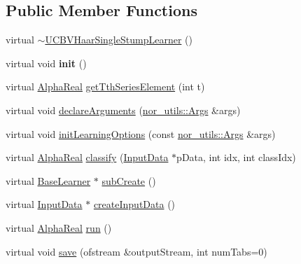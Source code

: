 \subsection*{Public Member Functions}
\begin{DoxyCompactItemize}
\item 
virtual \hyperlink{classMultiBoost_1_1UCBVHaarSingleStumpLearner_a8826c1e151e6e92c6f3a90e1d0b2b51c}{$\sim$UCBVHaarSingleStumpLearner} ()
\item 
\hypertarget{classMultiBoost_1_1UCBVHaarSingleStumpLearner_a3c8a8cbbc9d19130d7b1ebfee41d5274}{
virtual void {\bfseries init} ()}
\label{classMultiBoost_1_1UCBVHaarSingleStumpLearner_a3c8a8cbbc9d19130d7b1ebfee41d5274}

\item 
virtual \hyperlink{Defaults_8h_a80184c4fd10ab70a1a17c5f97dcd1563}{AlphaReal} \hyperlink{classMultiBoost_1_1UCBVHaarSingleStumpLearner_a31769c63bcc41befd2259802a2780cde}{getTthSeriesElement} (int t)
\item 
virtual void \hyperlink{classMultiBoost_1_1UCBVHaarSingleStumpLearner_aedbbd65aa2801237f3a6dc3a46e43997}{declareArguments} (\hyperlink{classnor__utils_1_1Args}{nor\_\-utils::Args} \&args)
\item 
virtual void \hyperlink{classMultiBoost_1_1UCBVHaarSingleStumpLearner_acaadef7c0c556c083df313440e974069}{initLearningOptions} (const \hyperlink{classnor__utils_1_1Args}{nor\_\-utils::Args} \&args)
\item 
virtual \hyperlink{Defaults_8h_a80184c4fd10ab70a1a17c5f97dcd1563}{AlphaReal} \hyperlink{classMultiBoost_1_1UCBVHaarSingleStumpLearner_ad18695306233436b91f55687f05d77b5}{classify} (\hyperlink{classMultiBoost_1_1InputData}{InputData} $\ast$pData, int idx, int classIdx)
\item 
virtual \hyperlink{classMultiBoost_1_1BaseLearner}{BaseLearner} $\ast$ \hyperlink{classMultiBoost_1_1UCBVHaarSingleStumpLearner_a610378dff74c18b1b5e0f3bacc4c95f5}{subCreate} ()
\item 
virtual \hyperlink{classMultiBoost_1_1InputData}{InputData} $\ast$ \hyperlink{classMultiBoost_1_1UCBVHaarSingleStumpLearner_a4d03a4efd43a727e7079936100cb56c1}{createInputData} ()
\item 
virtual \hyperlink{Defaults_8h_a80184c4fd10ab70a1a17c5f97dcd1563}{AlphaReal} \hyperlink{classMultiBoost_1_1UCBVHaarSingleStumpLearner_aa66e42f767c51d321e788208a5cfb8c5}{run} ()
\item 
virtual void \hyperlink{classMultiBoost_1_1UCBVHaarSingleStumpLearner_a9844f395b5e9315e32e46ec27df50a75}{save} (ofstream \&outputStream, int numTabs=0)

\end{DoxyCompactItemize}
